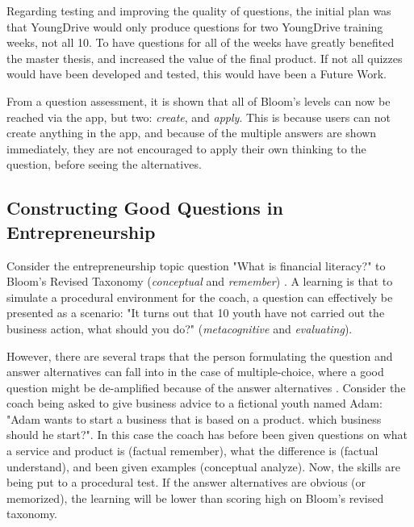 
  Regarding testing and improving the quality of questions, the initial plan was that YoungDrive would only produce questions for two YoungDrive training weeks, not all 10. To have questions for all of the weeks have greatly benefited the master thesis, and increased the value of the final product. If not all quizzes would have been developed and tested, this would have been a Future Work.

  From a question assessment, it is shown that all of Bloom's levels can now be reached via the app, but two: \textit{create}, and \textit{apply}. This is because users can not create anything in the app, and because of the multiple answers are shown immediately, they are not encouraged to apply their own thinking to the question, before seeing the alternatives.

  \subsection{Constructing Good Questions in Entrepreneurship}

  Consider the entrepreneurship topic question "What is financial literacy?" to Bloom's Revised Taxonomy (\textit{conceptual} and \textit{remember}) \cite{krathwohl}. A learning is that to simulate a procedural environment for the coach, a question can effectively be presented as a scenario: "It turns out that 10 youth have not carried out the business action, what should you do?" (\textit{metacognitive} and \textit{evaluating}).

  However, there are several traps that the person formulating the question and answer alternatives can fall into in the case of multiple-choice, where a good question might be de-amplified because of the answer alternatives \citep{nicol}. Consider the coach being asked to give business advice to a fictional youth named Adam: "Adam wants to start a business that is based on a product. which business should he start?". In this case the coach has before been given questions on what a service and product is (factual remember), what the difference is (factual understand), and been given examples (conceptual analyze). Now, the skills are being put to a procedural test. If the answer alternatives are obvious (or memorized), the learning will be lower than scoring high on Bloom's revised taxonomy.

